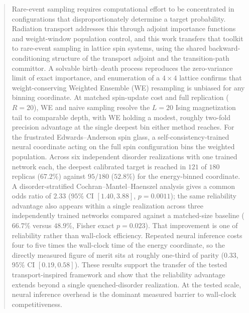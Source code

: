 \documentclass[a4paper,fleqn]{cas-sc}
\begin{document}
\begin{abstract}
Rare-event sampling requires computational effort to be concentrated in configurations that
disproportionately determine a target probability. Radiation transport addresses this through
adjoint importance functions and weight-window population control, and this work transfers
that toolkit to rare-event sampling in lattice spin systems, using the shared
backward-conditioning structure of the transport adjoint and the transition-path committor. A
solvable birth--death process reproduces the zero-variance limit of exact importance, and
enumeration of a $4\times4$ lattice confirms that weight-conserving Weighted Ensemble (WE)
resampling is unbiased for any binning coordinate. At matched spin-update cost and full
replication ($R=20$), WE and naive sampling resolve the $L=20$ Ising magnetization tail to
comparable depth, with WE holding a modest, roughly two-fold precision advantage at the single
deepest bin either method reaches. For the
frustrated Edwards--Anderson spin glass, a self-consistency-trained neural coordinate acting on
the full spin configuration bins the weighted population. Across six independent disorder
realizations with one trained network each, the deepest calibrated target is reached in $121$
of $180$ replicas ($67.2\%$) against $95/180$ ($52.8\%$) for the energy-binned coordinate.
A disorder-stratified Cochran--Mantel--Haenszel analysis gives a common odds ratio of $2.33$
($95\%$ CI $[1.40,3.88]$, $p=0.0011$); the same reliability advantage also appears within a
single realization across three independently trained networks compared against a matched-size
baseline ($66.7\%$ versus $48.9\%$, Fisher exact $p=0.023$). That improvement is one of
reliability rather than wall-clock efficiency. Repeated neural inference costs four to five
times the wall-clock time of the energy coordinate, so the directly measured figure of merit
sits at roughly one-third of parity ($0.33$, $95\%$ CI $[0.19,0.58]$). These results support
the transfer of the tested transport-inspired framework and show that the reliability advantage
extends beyond a single quenched-disorder realization. At the tested scale, neural inference
overhead is the dominant measured barrier to wall-clock competitiveness.
\end{abstract}
\end{document}
